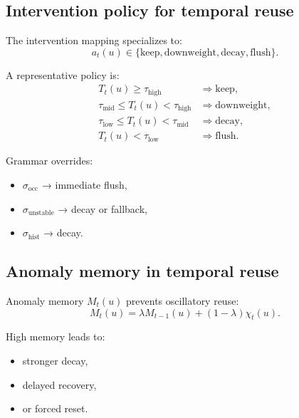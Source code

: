 \documentclass[11pt]{article}
\theoremstyle{definition}
\theoremstyle{plain}
\begin{document}

\subsection{Intervention policy for temporal reuse}

The intervention mapping specializes to:
\begin{equation}
a_t(u)\in\{\mathrm{keep},\mathrm{downweight},\mathrm{decay},\mathrm{flush}\}.
\end{equation}

A representative policy is:
\begin{align}
T_t(u)\ge \tau_{\mathrm{high}} &\Rightarrow \mathrm{keep},\\
\tau_{\mathrm{mid}}\le T_t(u)<\tau_{\mathrm{high}} &\Rightarrow \mathrm{downweight},\\
\tau_{\mathrm{low}}\le T_t(u)<\tau_{\mathrm{mid}} &\Rightarrow \mathrm{decay},\\
T_t(u)<\tau_{\mathrm{low}} &\Rightarrow \mathrm{flush}.
\end{align}

Grammar overrides:
\begin{itemize}[leftmargin=1.5em]
    \item $\sigma_{\mathrm{occ}}$ → immediate flush,
    \item $\sigma_{\mathrm{unstable}}$ → decay or fallback,
    \item $\sigma_{\mathrm{hist}}$ → decay.
\end{itemize}


\subsection{Anomaly memory in temporal reuse}

Anomaly memory $M_t(u)$ prevents oscillatory reuse:
\begin{equation}
M_t(u)=\lambda M_{t-1}(u)+(1-\lambda)\chi_t(u).
\end{equation}

High memory leads to:
\begin{itemize}[leftmargin=1.5em]
    \item stronger decay,
    \item delayed recovery,
    \item or forced reset.
\end{itemize}
\end{document}
